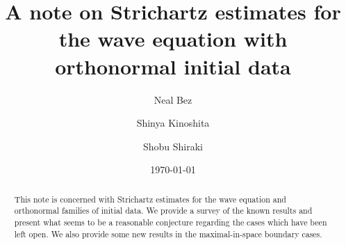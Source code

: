 \documentclass[a4paper]{amsart}
\author[Bez]{Neal Bez}
\author[Kinoshita]{Shinya Kinoshita}
\author[Shiraki]{Shobu Shiraki}
\numberwithin{equation}{section}%
\theoremstyle{plain}%
\theoremstyle{definition}
\theoremstyle{remark}%
\begin{document}
\date{\today}
\title[
]
{
A note on Strichartz estimates for the wave equation with orthonormal initial data
}


\keywords{}
\subjclass[2010]{}
\begin{abstract}
This note is concerned with Strichartz estimates for the wave equation and orthonormal families of initial data. We provide a survey of the known results and present what seems to be a reasonable conjecture regarding the cases which have been left open. We also provide some new results in the maximal-in-space boundary cases.
\end{abstract}

\maketitle
\end{document}
